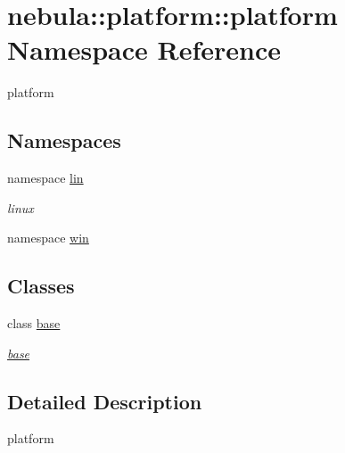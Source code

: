 \hypertarget{namespacenebula_1_1platform_1_1platform}{
\section{nebula::platform::platform Namespace Reference}
\label{namespacenebula_1_1platform_1_1platform}
}


platform  
\subsection*{Namespaces}
\begin{DoxyCompactItemize}
\item 
namespace \hyperlink{namespacenebula_1_1platform_1_1platform_1_1lin}{lin}


\begin{DoxyCompactList}\small\item\em linux \item\end{DoxyCompactList}\item 
namespace \hyperlink{namespacenebula_1_1platform_1_1platform_1_1win}{win}
\end{DoxyCompactItemize}
\subsection*{Classes}
\begin{DoxyCompactItemize}
\item 
class \hyperlink{classnebula_1_1platform_1_1platform_1_1base}{base}
\begin{DoxyCompactList}\small\item\em \hyperlink{classnebula_1_1platform_1_1platform_1_1base}{base} \item\end{DoxyCompactList}\end{DoxyCompactItemize}


\subsection{Detailed Description}
platform 